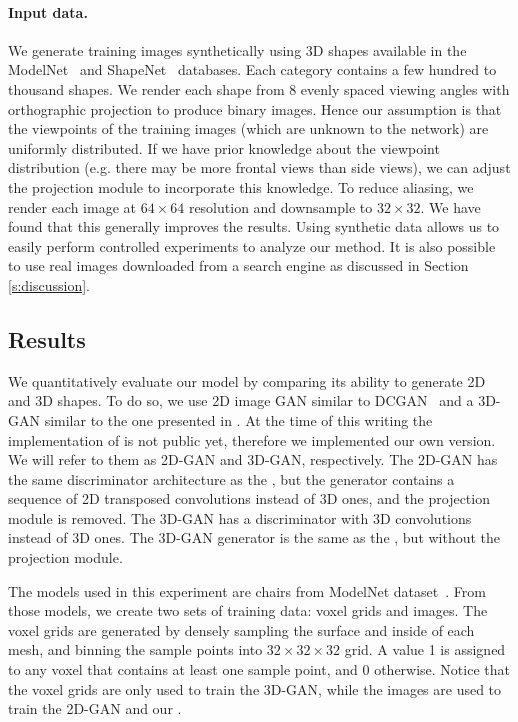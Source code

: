 \paragraph{Input data.} We generate training images synthetically using 3D shapes available in the
ModelNet~\cite{wu20153d} and ShapeNet~\cite{chang2015shapenet} databases. Each category contains a few hundred to thousand shapes. We render each
shape from 8 evenly spaced viewing angles with orthographic projection to produce binary images. Hence our assumption is that the viewpoints of the training images (which are unknown to the network) are uniformly distributed. If we have prior knowledge about the viewpoint distribution (e.g. there may be more frontal views than side views), we can adjust the projection module to incorporate this knowledge. To reduce aliasing, we
render each image at $64\times64$ resolution and downsample to $32\times32$. We have found that this generally improves
the results. Using synthetic data allows us to easily perform controlled experiments to analyze our method. 
It is also possible to use real images downloaded from a search engine as discussed in Section \ref{s:discussion}.

\subsection{Results}
We quantitatively evaluate our model by comparing its ability to generate
2D and 3D shapes.
To do so, we use 2D image GAN similar to DCGAN~\cite{radford2015unsupervised} and a 3D-GAN
similar to the one presented in \cite{wu2016learning}.
At the time of this writing the implementation of \cite{wu2016learning} is not public yet, therefore we
implemented our own version.
We will refer to them as 2D-GAN and 3D-GAN, respectively.
The 2D-GAN has the same discriminator architecture as the \prgan, but the generator contains a sequence of 2D transposed convolutions instead of 3D ones, and
the projection module is removed.
The 3D-GAN has a discriminator with 3D convolutions instead of 3D ones.
The 3D-GAN generator is the same as the \prgan, but without the projection module.

The models used in this experiment are chairs from ModelNet dataset~\cite{wu20153d}.
From those models, we create two sets of training data: voxel grids and images.
The voxel grids are generated by densely sampling the surface and inside of each mesh, and binning the sample points into $32\times32\times32$ 
grid.
A value 1 is assigned to any voxel that contains at least one sample point, and 0 otherwise.
Notice that the voxel grids are only used to train the 3D-GAN, while the images are used to train the 2D-GAN and our \prgan.

